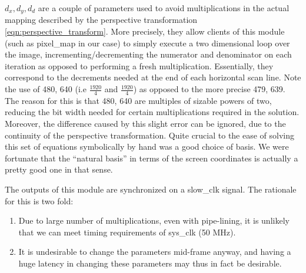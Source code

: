\documentclass{article}
\begin{document}
$d_x, d_y, d_d$ are a couple of parameters used to avoid multiplications in the actual mapping described by the perspective transformation
\eqref{eqn:perspective_transform}.
More precisely, they allow clients of this module (such as pixel\_map in our case) to simply execute a two dimensional loop over the image,
incrementing/decrementing the numerator and denominator on each iteration as opposed to performing a fresh multiplication.
Essentially, they correspond to the decrements needed at the end of each horizontal scan line.
Note the use of 480, 640 (i.e $\frac{1920}{4}$ and $\frac{1920}{4}$) as opposed to the more precise 479, 639.
The reason for this is that 480, 640 are multiples of sizable powers of two, reducing the bit width needed for certain multiplications required in the solution.
Moreover, the difference caused by this slight error can be ignored, due to the continuity of the perspective transformation.
Quite crucial to the ease of solving this set of equations symbolically by hand was a good choice of basis.
We were fortunate that the ``natural basis'' in terms of the screen coordinates is actually a pretty good one in that sense.

The outputs of this module are synchronized on a slow\_clk signal.
The rationale for this is two fold:
\begin{enumerate}
    \item Due to large number of multiplications, even with pipe-lining, it is unlikely that we can meet timing requirements of sys\_clk (50 MHz).
    \item It is undesirable to change the parameters mid-frame anyway, and having a huge latency in changing these parameters may thus in fact be desirable.
\end{enumerate}
\end{document}
